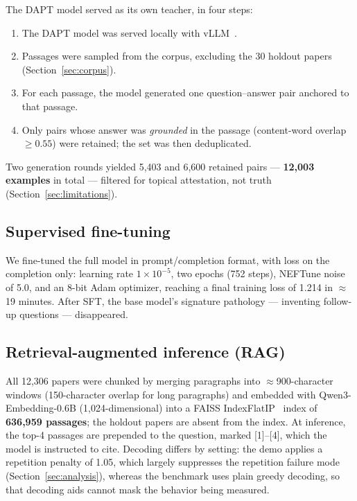 \documentclass[11pt]{article}
\begin{document}
The DAPT model served as its own teacher, in four steps:
\begin{enumerate}
\item The DAPT model was served locally with vLLM~\cite{vllm}.
\item Passages were sampled from the corpus, excluding the 30 holdout
papers (Section~\ref{sec:corpus}).
\item For each passage, the model generated one question--answer pair
anchored to that passage.
\item Only pairs whose answer was \emph{grounded} in the passage
(content-word overlap $\geq 0.55$) were retained; the set was then
deduplicated.
\end{enumerate}
Two generation rounds yielded 5,403 and 6,600 retained pairs ---
\textbf{12,003 examples} in total --- filtered for topical
attestation, not truth (Section~\ref{sec:limitations}).

\subsection{Supervised fine-tuning}
\label{sec:sft-train}

We fine-tuned the full model in prompt/completion format, with loss on
the completion only: learning rate $1\times10^{-5}$, two epochs (752
steps), NEFTune noise~\cite{neftune} of 5.0, and an 8-bit Adam
optimizer, reaching a final training loss of 1.214 in $\approx$19
minutes. After SFT, the base model's signature pathology ---
inventing follow-up questions --- disappeared.

\subsection{Retrieval-augmented inference (RAG)}
\label{sec:rag}

All 12,306 papers were chunked by merging paragraphs into
$\approx$900-character windows (150-character overlap for long
paragraphs) and embedded with Qwen3-Embedding-0.6B (1,024-dimensional)
into a FAISS IndexFlatIP~\cite{faiss} index of \textbf{636,959
passages}; the holdout papers are absent from the index. At inference,
the top-4 passages are prepended to the question, marked [1]--[4],
which the model is instructed to cite. Decoding differs by setting:
the demo applies a repetition penalty of 1.05, which largely
suppresses the repetition failure mode (Section~\ref{sec:analysis}),
whereas the benchmark uses plain greedy decoding, so that decoding
aids cannot mask the behavior being measured.
\end{document}
